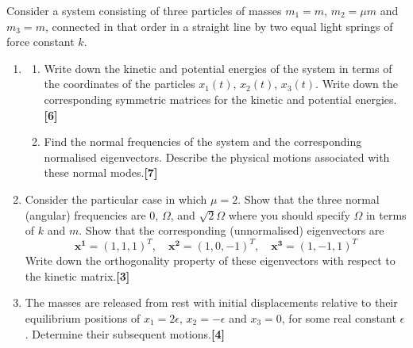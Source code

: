 \documentclass[a4paper]{article}
\begin{document}
\begin{qns}
Consider a system consisting of three particles of masses $m_1=m$, $m_2 =\mu m$ and $m_3 = m$, connected in that order in a straight line by two equal light springs of force constant $k$.
\begin{enumerate}[label=(\alph*)]
\item 
\begin{enumerate}[label=(\roman*)]
\item Write down the kinetic and potential energies of the system in terms of the
coordinates of the particles $x_1(t)$, $x_2(t)$, $x_3(t)$. Write down the corresponding symmetric matrices for the kinetic and potential energies.\hfill\textbf{[6]}
\item Find the normal frequencies of the system and the corresponding normalised eigenvectors. Describe the physical motions associated with these normal modes.\hfill\textbf{[7]}
\end{enumerate}
\item Consider the particular case in which $\mu=2$. Show that the three normal (angular) frequencies are 0, $\Omega$, and $\sqrt{2}\Omega$ where you should specify $\Omega$ in terms of $k$ and $m$. Show that the corresponding (unnormalised) eigenvectors are
$$\mathbf{x^1}=(1,1,1)^T,\quad\mathbf{x^2}=(1,0,-1)^T,\quad\mathbf{x^3}=(1,-1,1)^T$$
Write down the orthogonality property of these eigenvectors with respect to the kinetic matrix.\hfill\textbf{[3]}
\item The masses are released from rest with initial displacements relative to their equilibrium positions of $x_1=2\epsilon$, $x_2=-\epsilon$ and $x_3 = 0$, for some real constant $\epsilon$. Determine their subsequent motions.\hfill\textbf{[4]}
\end{enumerate}
\end{qns}
\end{document}
